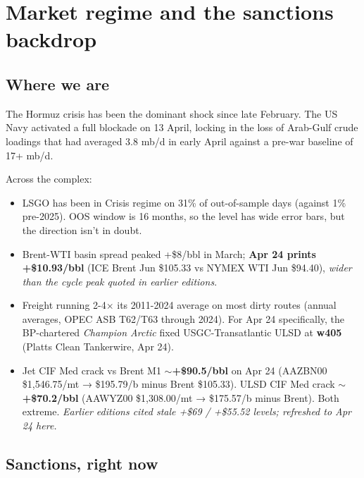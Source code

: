 \documentclass[10pt,a4paper]{article}
\begin{document}
\section{Market regime and the sanctions backdrop}\label{sec:2}

\subsection{Where we are}

\noindent\begin{minipage}[t]{0.58\linewidth}\vspace{0pt}

The Hormuz crisis has been the dominant shock since late February. The US Navy activated a full blockade on 13 April, locking in the loss of Arab-Gulf crude loadings that had averaged 3.8 mb/d in early April against a pre-war baseline of 17+ mb/d.

Across the complex:

\begin{itemize}[leftmargin=1em,itemsep=0pt]
  \item LSGO has been in Crisis regime on 31\% of out-of-sample days (against 1\% pre-2025). OOS window is 16 months, so the level has wide error bars, but the direction isn't in doubt.
  \item Brent-WTI basin spread peaked +\$8/bbl in March; \textbf{Apr 24 prints +\$10.93/bbl} (ICE Brent Jun \$105.33 vs NYMEX WTI Jun \$94.40), \emph{wider than the cycle peak quoted in earlier editions}.
  \item Freight running 2-4$\times$ its 2011-2024 average on most dirty routes (annual averages, OPEC ASB T62/T63 through 2024). For Apr 24 specifically, the BP-chartered \emph{Champion Arctic} fixed USGC-Transatlantic ULSD at \textbf{w405} (Platts Clean Tankerwire, Apr 24).
  \item Jet CIF Med crack vs Brent M1 \textbf{$\sim$+\$90.5/bbl} on Apr 24 (AAZBN00 \$1,546.75/mt → \$195.79/b minus Brent \$105.33). ULSD CIF Med crack \textbf{$\sim$+\$70.2/bbl} (AAWYZ00 \$1,308.00/mt → \$175.57/b minus Brent). Both extreme. \emph{Earlier editions cited stale +\$69 / +\$55.52 levels; refreshed to Apr 24 here.}
\end{itemize}

\subsection{Sanctions, right now}


\end{minipage}
\end{document}
